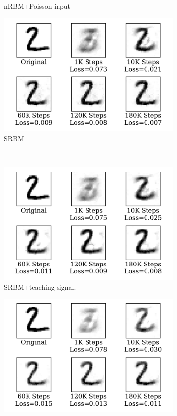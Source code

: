 \begin{figure}
\begin{subfigure}[t]{0.32\textwidth}
		\caption{nRBM+Poisson input}
	\end{subfigure}
	\begin{subfigure}[t]{0.32\textwidth}
		\includegraphics[width=\textwidth]{pics_sdlm/50_MNIST_SRBM_original/recon_digit.pdf}
		\caption{SRBM}
	\end{subfigure}\\
	\begin{subfigure}[t]{0.32\textwidth}
		\includegraphics[width=\textwidth]{pics_sdlm/51_MNIST_SRBM_teach/recon_digit.pdf}
		\caption{SRBM+teaching signal.}
	\end{subfigure}
	\begin{subfigure}[t]{0.32\textwidth}
		\includegraphics[width=\textwidth]{pics_sdlm/52_MNIST_SRBM_noise/recon_digit.pdf}

\end{subfigure}
\end{figure}
